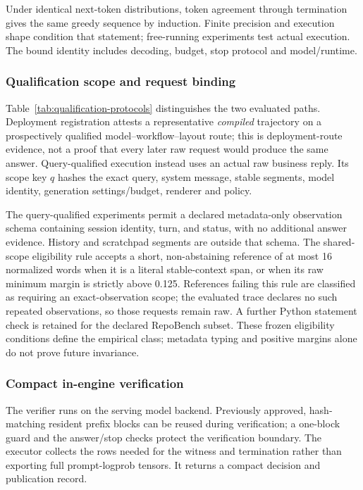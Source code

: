 Under identical next-token distributions, token agreement through termination gives the same greedy sequence by induction. Finite precision and execution shape condition that statement; free-running experiments test actual execution. The bound identity includes decoding, budget, stop protocol and model/runtime.

\subsubsection{Qualification scope and request binding}
Table~\ref{tab:qualification-protocols} distinguishes the two evaluated paths. Deployment registration attests a representative \emph{compiled} trajectory on a prospectively qualified model--workflow--layout route; this is deployment-route evidence, not a proof that every later raw request would produce the same answer. Query-qualified execution instead uses an actual raw business reply. Its scope key $q$ hashes the exact query, system message, stable segments, model identity, generation settings/budget, renderer and policy.



The query-qualified experiments permit a declared metadata-only observation schema containing session identity, turn, and status, with no additional answer evidence. History and scratchpad segments are outside that schema. The shared-scope eligibility rule accepts a short, non-abstaining reference of at most 16 normalized words when it is a literal stable-context span, or when its raw minimum margin is strictly above 0.125. References failing this rule are classified as requiring an exact-observation scope; the evaluated trace declares no such repeated observations, so those requests remain raw. A further Python statement check is retained for the declared RepoBench subset. These frozen eligibility conditions define the empirical class; metadata typing and positive margins alone do not prove future invariance.

\subsubsection{Compact in-engine verification}
The verifier runs on the serving model backend. Previously approved, hash-matching resident prefix blocks can be reused during verification; a one-block guard and the answer/stop checks protect the verification boundary. The executor collects the rows needed for the witness and termination rather than exporting full prompt-logprob tensors. It returns a compact decision and publication record.

